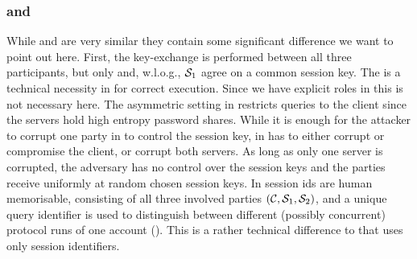 \subsubsection{\FTWOPAKE and \FPAKE}
While \FPAKE and \FTWOPAKE are very similar they contain some significant difference we want to point out here.
First, the key-exchange is performed between all three participants, but only \Client and, w.l.o.g., $\mathcal{S}_1$ agree on a common session key.
The \role is a technical necessity in \FPAKE for correct execution.
Since we have explicit roles in \FTWOPAKE this is not necessary here.
The asymmetric setting in \FTWOPAKE restricts \TestPwd queries to the client since the servers hold high entropy password shares.
While it is enough for the attacker to corrupt one party in \FPAKE to control the session key, in \FTWOPAKE \SIM has to either corrupt or compromise the client, or corrupt both servers.
As long as only one server is corrupted, the adversary has no control over the session 	keys and the parties receive uniformly at random chosen session keys.
In \FTWOPAKE session ids are human memorisable, consisting of all three involved parties $(\mathcal{C}, \mathcal{S}_1, \mathcal{S}_2)$, and a unique query identifier is used to distinguish between different (possibly concurrent) protocol runs of one account (\sid).
This is a rather technical difference to \FPAKE that uses only session identifiers.

	


